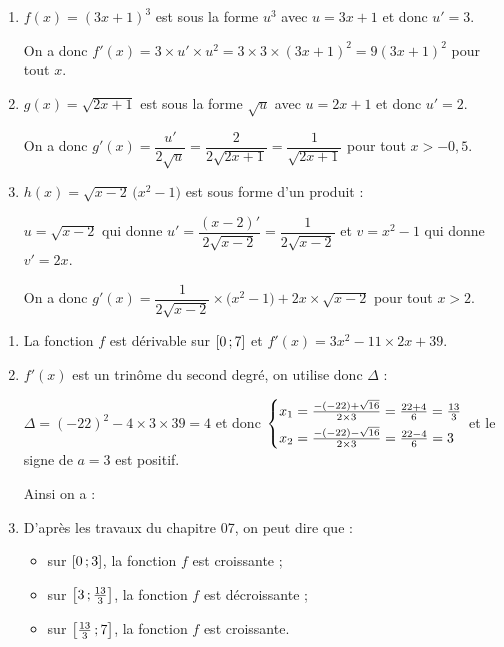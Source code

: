 \documentclass[a4paper,11pt]{article}
\begin{document}
\medskip


\begin{enumerate}
	\item $f(x)=(3x+1)^3$ est sous la forme  $u^3$ avec $u=3x+1$ et donc $u'=3$.
	
	On a donc $f'(x)=3 \times u' \times u^2 = 3 \times 3 \times (3x+1)^2=9(3x+1)^2$ pour tout $x$.
	\item $g(x)=\sqrt{2x+1}$ est sous la forme $\sqrt{u}$ avec $u=2x+1$ et donc $u'=2$.
	
	On a donc $g'(x)=\dfrac{u'}{2\sqrt{u}}=\dfrac{2}{2\sqrt{2x+1}}=\dfrac{1}{\sqrt{2x+1}}$ pour tout $x >-0,5$.
	\item $h(x)=\sqrt{x-2}\,\big(x^2-1\big)$ est sous forme d'un produit :
	
	\tabula{}$u=\sqrt{x-2}$ qui donne $u'=\dfrac{(x-2)'}{2\sqrt{x-2}}=\dfrac{1}{2\sqrt{x-2}}$ et $v=x^2-1$ qui donne $v'=2x$.
	
	On a donc $g'(x)=\dfrac{1}{2\sqrt{x-2}} \times \big(x^2-1\big) + 2x \times \sqrt{x-2}$ pour tout $x >2$.
\end{enumerate}

\medskip


\begin{enumerate}
	\item La fonction $f$ est dérivable sur $\mbox{\ensuremath{\left[0\mathpunct{};7\right]}}$ et $f'(x)=3x^2 - 11 \times 2x + 39$.
	\item $f'(x)$ est un trinôme du second degré, on utilise donc $\Delta$ :
	
	\tabula{}$\Delta = (-22)^2 - 4 \times 3 \times 39 = 4$ et donc $\begin{dcases} x_1=\tfrac{-(-22)+\sqrt{16}}{2 \times 3} = \tfrac{22+4}{6}=\tfrac{13}{3} \\ x_2=\tfrac{-(-22)-\sqrt{16}}{2 \times 3} = \tfrac{22-4}{6}=3 \end{dcases}$ et le signe de $a=3$ est positif.
	
	Ainsi on a :
	\begin{center}
	\end{center}
	\item D'après les \og travaux \fg{} du chapitre 07, on peut dire que :
	\begin{itemize}
		\item sur $\mbox{\ensuremath{\left[0\mathpunct{};3\right]}}$, la fonction $f$ est croissante ;
		\item sur $\mbox{\ensuremath{\left[3\mathpunct{};\tfrac{13}{3}\right]}}$, la fonction $f$ est décroissante ;
		\item sur $\mbox{\ensuremath{\left[\tfrac{13}{3}\mathpunct{};7\right]}}$, la fonction $f$ est croissante.
	\end{itemize}
\end{enumerate}
\end{document}
